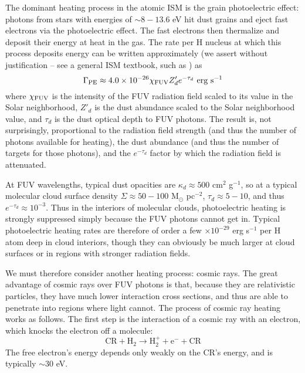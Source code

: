 The dominant heating process in the atomic ISM is the grain photoelectric effect: photons from stars with energies of $\sim 8-13.6$ eV hit dust grains and eject fast electrons via the photoelectric effect. The fast electrons then thermalize and deposit their energy at heat in the gas. The rate per H nucleus at which this process deposits energy can be written approximately (we assert without justification -- see a general ISM textbook, such as \citealt{draine11a}) as
\begin{equation}
\Gamma_{\rm PE} \approx 4.0\times 10^{-26} \chi_{\rm FUV} Z_d' e^{-\tau_d}\mbox{ erg s}^{-1}
\end{equation}
where $\chi_{\rm FUV}$ is the intensity of the FUV radiation field scaled to its value in the Solar neighborhood, $Z'_d$ is the dust abundance scaled to the Solar neighborhood value, and $\tau_d$ is the dust optical depth to FUV photons. The result is, not surprisingly, proportional to the radiation field strength (and thus the number of photons available for heating), the dust abundance (and thus the number of targets for those photons), and the $e^{-\tau_d}$ factor by which the radiation field is attenuated.

At FUV wavelengths, typical dust opacities are $\kappa_d \approx 500$ cm$^2$ g$^{-1}$, so at a typical molecular cloud surface density $\Sigma\approx 50 - 100$ M$_\odot$ pc$^{-2}$, $\tau_d \approx 5-10$, and thus $e^{-\tau_d} \approx 10^{-3}$. Thus in the interiors of molecular clouds, photoelectric heating is strongly suppressed simply because the FUV photons cannot get in. Typical photoelectric heating rates are therefore of order a few $\times 10^{-29}$ erg s$^{-1}$ per H atom deep in cloud interiors, though they can obviously be much larger at cloud surfaces or in regions with stronger radiation fields.

We must therefore consider another heating process: cosmic rays. The great advantage of cosmic rays over FUV photons is that, because they are relativistic particles, they have much lower interaction cross sections, and thus are able to penetrate into regions where light cannot. The process of cosmic ray heating works as follows. The first step is the interaction of a cosmic ray with an electron, which knocks the electron off a molecule:
\begin{equation}
\mbox{CR}+\mbox{H}_2 \rightarrow \mbox{H}_2^+ + \mbox{e}^- + \mbox{CR}
\end{equation}
The free electron's energy depends only weakly on the CR's energy, and is typically $\sim 30$ eV.

